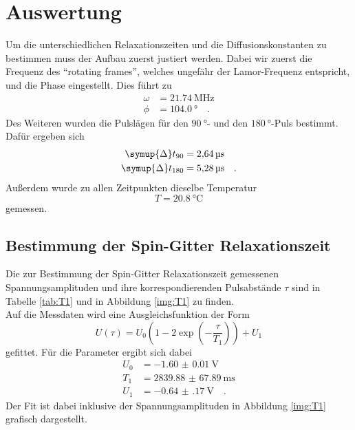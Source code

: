 \newpage 
\section{Auswertung}

\noindent
Um die unterschiedlichen Relaxationszeiten und die Diffusionskonstanten zu bestimmen muss der Aufbau zuerst justiert werden. 
Dabei wir zuerst die Frequenz des \enquote{rotating frames}, welches ungefähr der Lamor-Frequenz entspricht, und die Phase eingestellt. Dies führt zu 
\begin{align*}
  \omega &= \SI{21.74}{\mega\hertz}\\
  \phi &= \SI{104.0}{\degree} \quad .
\end{align*}
Des Weiteren wurden die Pulslägen für den $\SI{90}{\degree}$- und den $\SI{180}{\degree}$-Puls bestimmt. Dafür ergeben sich
\begin{align*}
  \symup{\Delta} t_{90} &= \SI{2.64}{\micro\second}\\
  \symup{\Delta} t_{180} &= \SI{5.28}{\micro\second} \quad .
\end{align*}
Außerdem wurde zu allen Zeitpunkten dieselbe Temperatur 
\begin{equation*}
  T = \SI{20.8}{\degreeCelsius}
\end{equation*}
gemessen.


\subsection{Bestimmung der Spin-Gitter Relaxationszeit}

\noindent
Die zur Bestimmung der Spin-Gitter Relaxationszeit gemessenen Spannungsamplituden und ihre korrespondierenden Pulsabstände $\tau$ sind in Tabelle \ref{tab:T1} und in Abbildung \ref{img:T1} zu finden.\\
Auf die Messdaten wird eine Ausgleichsfunktion der Form 
\begin{equation*}
  U\left(\tau\right) = U_0 \left(1-2\exp{\left(-\frac{\tau}{T_1}\right)}\right) + U_1
\end{equation*}
gefittet. Für die Parameter ergibt sich dabei
\begin{align*}
  U_0 &= \SI{-1.60(1)}{\volt}\\
  T_1 &= \SI{2839.88(6789)}{\milli\second}\\
  U_1 &= \SI{-0.64(17)}{\volt} \quad .
\end{align*}
Der Fit ist dabei inklusive der Spannungsamplituden in Abbildung \ref{img:T1} grafisch dargestellt.

